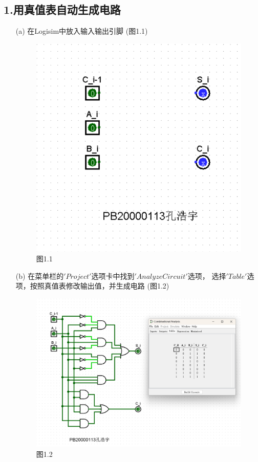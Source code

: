 \documentclass{article}
\begin{document}
        \subsection*{1.用真值表自动生成电路}
        \begin{enumerate}
            \item [(a)]在Logisim中放入输入输出引脚 (图1.1)
            \begin{figure}[htbp]
                \centering
                \includegraphics[scale=0.5]{t11.png}
                \caption*{图1.1}
            \end{figure}
            \item [(b)]在菜单栏的$'Project'$选项卡中找到$'Analyze Circuit'$选项，
            选择$'Table'$选项，按照真值表修改输出值，并生成电路 (图1.2)
            \begin{figure}[htbp]
                \centering
                \includegraphics[scale=0.5]{t12.png}
                \caption*{图1.2}
            \end{figure}
        \end{enumerate}
        \clearpage
\end{document}
